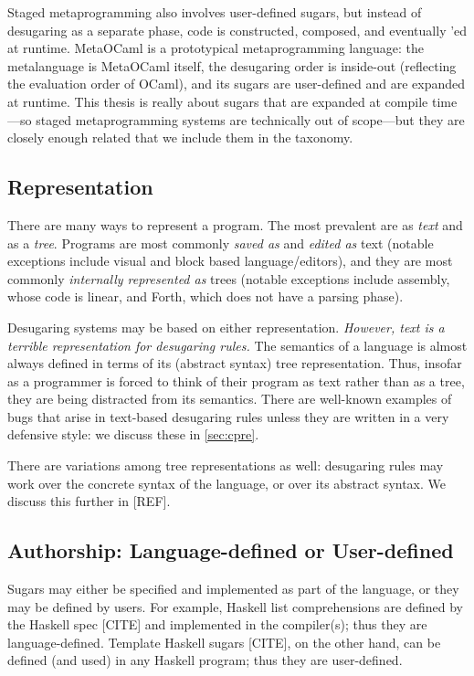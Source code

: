 Staged metaprogramming also involves user-defined sugars, but instead
of desugaring as a separate phase, code is constructed, composed, and
eventually 'ed at runtime. MetaOCaml is a prototypical
metaprogramming language: the metalanguage is MetaOCaml itself,
the desugaring order is inside-out (reflecting the evaluation
order of OCaml), and its sugars are user-defined and are expanded at runtime.
This thesis is really about sugars that are expanded
at compile time---so staged metaprogramming systems are technically out of scope---but
they are closely enough related that we include them in the taxonomy.


\subsection{Representation}

There are many ways to represent a program. The most prevalent are as
\emph{text} and as a \emph{tree}. Programs are most commonly
\emph{saved as} and \emph{edited as} text (notable exceptions include
visual and block based language/editors), and they are most commonly
\emph{internally represented as} trees (notable exceptions include
assembly, whose code is linear, and Forth, which does not have a
parsing phase).

Desugaring systems may be based on either representation.
\emph{However, text is a terrible representation for desugaring rules.}
The semantics of a language is almost always defined in terms of its
(abstract syntax) tree representation. Thus, insofar as a programmer
is forced to think of their program as text rather
than as a tree, they are being distracted from its semantics. There
are well-known examples of bugs that arise in text-based desugaring
rules unless they are written in a very defensive style: we discuss
these in \ref{sec:cpre}.

There are variations among tree representations as well: desugaring
rules may work over the concrete syntax of the language, or over its
abstract syntax. We discuss this further in [REF].

\subsection{Authorship: Language-defined or User-defined}

Sugars may either be specified and implemented as part of the
language, or they may be defined by users. For example, Haskell list
comprehensions are defined by the Haskell spec [CITE] and implemented
in the compiler(s); thus they are language-defined. Template Haskell
sugars [CITE], on the other hand, can be defined (and used) in any
Haskell program; thus they are user-defined.

